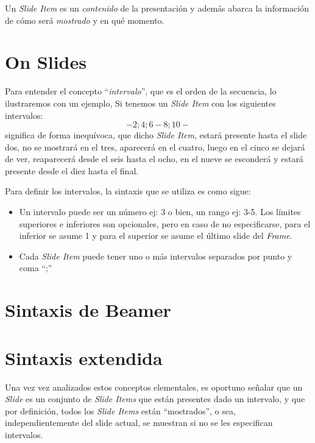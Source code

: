 		Un \textit{Slide Item} es un \textit{contenido} de la presentación y además abarca la información de cómo será \textit{mostrado} y en qué momento.
	

	\section{On Slides} %
	\label{sec:on_slides}

		Para entender el concepto ``\textit{intervalo}'', que es el orden de la secuencia, lo ilustraremos con un ejemplo, Si tenemos un \textit{Slide Item} con los siguientes intervalos: $$-2;4;6-8;10-$$ significa de forma inequívoca, que dicho \textit{Slide Item}, estará presente hasta el slide dos, no se mostrará en el tres, aparecerá en el cuatro, luego en el cinco se dejará de ver, reaparecerá desde el seis hasta el ocho, en el nueve se esconderá y estará presente desde el diez hasta el final. 

	Para definir los intervalos, la sintaxis que se utiliza es como sigue:
	\begin{itemize}
		\item Un intervalo puede ser un número ej: 3 o bien, un rango ej: 3-5. Los límites superiores e inferiores son opcionales, pero en caso de no especificarse, para el inferior se asume 1 y para el superior se asume el último slide del \textit{Frame}.
		\item Cada \textit{Slide Item} puede tener uno o más intervalos separados por punto y coma ``;''
	\end{itemize}	
	

	\section{Sintaxis de Beamer} %
	\label{sec:sintaxis_de_beamer}
	

	\section{Sintaxis extendida} %
	\label{sec:sintaxis_extendida}
	



	Una vez vez analizados estos conceptos elementales, es oportuno señalar que un \textit{Slide} es un conjunto de \textit{Slide Items} que están presentes dado un intervalo, y que por definición, todos los \textit{Slide Items} están ``mostrados'', o sea, independientemente del slide actual, se muestran si no se les especifican intervalos.

